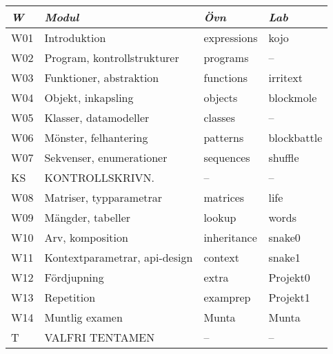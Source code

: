 \begin{tabular}{l|l|l|l}
\textit{W} & \textit{Modul} & \textit{Övn} & \textit{Lab} \\ \hline \hline
W01 & Introduktion & expressions & kojo \\
W02 & Program, kontrollstrukturer & programs & -- \\
W03 & Funktioner, abstraktion & functions & irritext \\
W04 & Objekt, inkapsling & objects & blockmole \\
W05 & Klasser, datamodeller & classes & -- \\
W06 & Mönster, felhantering & patterns & blockbattle \\
W07 & Sekvenser, enumerationer & sequences & shuffle \\
KS & KONTROLLSKRIVN. & -- & -- \\
W08 & Matriser, typparametrar & matrices & life \\
W09 & Mängder, tabeller & lookup & words \\
W10 & Arv, komposition & inheritance & snake0 \\
W11 & Kontextparametrar, api-design & context & snake1 \\
W12 & Fördjupning & extra & Projekt0 \\
W13 & Repetition & examprep & Projekt1 \\
W14 & Muntlig examen & Munta & Munta \\
T & VALFRI TENTAMEN & -- & -- \\
\end{tabular}
